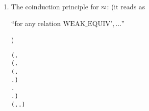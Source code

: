 \begin{enumerate}
\begin{small}
\end{small}
\item The coinduction principle for $\approx$: (it reads as \begin{small}``for any relation $\mathrm{WEAK\_EQUIV'}, \ldots$''\end{small})
\begin{small}
\begin{alltt}
\HOLTokenTurnstile{} (\HOLSymConst{\HOLTokenForall{}} .
           \HOLSymConst{\HOLTokenImp{}}
        (\HOLSymConst{\HOLTokenForall{}}.
             (\HOLSymConst{\HOLTokenForall{}}.
                   \HOLTokenTransBegin{} \HOLTokenTransEnd {} \HOLSymConst{\HOLTokenImp{}}
                  \HOLSymConst{\HOLTokenExists{}}.  \HOLTokenWeakTransBegin{} \HOLTokenWeakTransEnd {} \HOLSymConst{\HOLTokenConj{}}   ) \HOLSymConst{\HOLTokenConj{}}
             \HOLSymConst{\HOLTokenForall{}}.
                  \HOLTokenTransBegin{} \HOLTokenTransEnd {} \HOLSymConst{\HOLTokenImp{}}
                 \HOLSymConst{\HOLTokenExists{}}.  \HOLTokenWeakTransBegin{} \HOLTokenWeakTransEnd {} \HOLSymConst{\HOLTokenConj{}}   ) \HOLSymConst{\HOLTokenConj{}}
        (\HOLSymConst{\HOLTokenForall{}}.  \HOLTokenTransBegin\HOLSymConst{\ensuremath{\tau}}\HOLTokenTransEnd {} \HOLSymConst{\HOLTokenImp{}} \HOLSymConst{\HOLTokenExists{}}.  \HOLSymConst{\HOLTokenEPS}  \HOLSymConst{\HOLTokenConj{}}   ) \HOLSymConst{\HOLTokenConj{}}

\end{alltt}
\end{small}
\end{enumerate}
